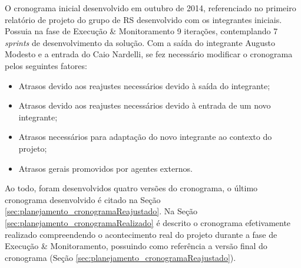 O cronograma inicial desenvolvido em outubro de 2014, referenciado no primeiro relatório de projeto do grupo de RS desenvolvido com os integrantes iniciais. Possuia na fase de Execução \& Monitoramento 9 iterações, contemplando 7 \emph{sprints} de desenvolvimento da solução. Com a saída do integrante Augusto Modesto e a entrada do Caio Nardelli, se fez necessário modificar o cronograma pelos seguintes fatores:
\begin{itemize}
	\item{Atrasos devido aos reajustes necessários devido à saída do integrante;}
	\item{Atrasos devido aos reajustes necessários devido à entrada de um novo integrante;}
	\item{Atrasos necessários para adaptação do novo integrante ao contexto do projeto;}
	\item{Atrasos gerais promovidos por agentes externos.}
\end{itemize}
Ao todo, foram desenvolvidos quatro versões do cronograma, o último cronograma desenvolvido é citado na Seção \ref{sec:planejamento_cronogramaReajustado}.
Na Seção \ref{sec:planejamento_cronogramaRealizado} é descrito o cronograma efetivamente realizado compreendendo o acontecimento real do projeto durante a fase de Execução \& Monitoramento, possuindo como referência a versão final do cronograma (Seção \ref{sec:planejamento_cronogramaReajustado}).